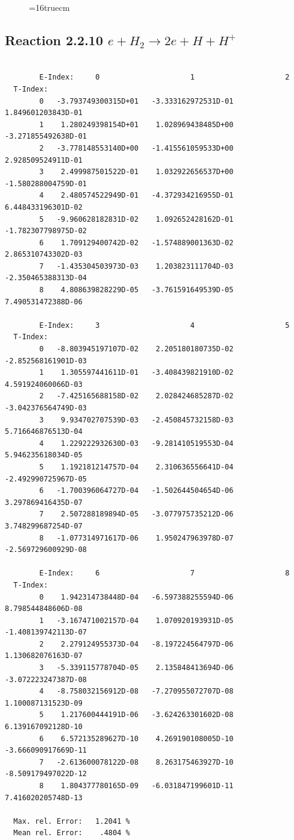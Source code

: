 \documentclass[12pt,dvips]{article}
\begin{document}
\begin{figure} \label{2.2.9}
\epsfxsize=16truecm
\end{figure}
\newpage

\subsection{
Reaction 2.2.10  $ e + H_2  \rightarrow 2e + H + H^+  $ }

\begin{small}\begin{verbatim}

        E-Index:     0                     1                     2
  T-Index:
        0   -3.793749300315D+01   -3.333162972531D-01    1.849601203843D-01
        1    1.280249398154D+01    1.028969438485D+00   -3.271855492638D-01
        2   -3.778148553140D+00   -1.415561059533D+00    2.928509524911D-01
        3    2.499987501522D-01    1.032922656537D+00   -1.580288004759D-01
        4    2.480574522949D-01   -4.372934216955D-01    6.448433196301D-02
        5   -9.960628182831D-02    1.092652428162D-01   -1.782307798975D-02
        6    1.709129400742D-02   -1.574889001363D-02    2.865310743302D-03
        7   -1.435304503973D-03    1.203823111704D-03   -2.350465388313D-04
        8    4.808639828229D-05   -3.761591649539D-05    7.490531472388D-06

        E-Index:     3                     4                     5
  T-Index:
        0   -8.803945197107D-02    2.205180180735D-02   -2.852568161901D-03
        1    1.305597441611D-01   -3.408439821910D-02    4.591924060066D-03
        2   -7.425165688158D-02    2.028424685287D-02   -3.042376564749D-03
        3    9.934702707539D-03   -2.450845732158D-03    5.716646876513D-04
        4    1.229222932630D-03   -9.281410519553D-04    5.946235618034D-05
        5    1.192181214757D-04    2.310636556641D-04   -2.492990725967D-05
        6   -1.700396064727D-04   -1.502644504654D-06    3.297869416435D-07
        7    2.507288189894D-05   -3.077975735212D-06    3.748299687254D-07
        8   -1.077314971617D-06    1.950247963978D-07   -2.569729600929D-08

        E-Index:     6                     7                     8
  T-Index:
        0    1.942314738448D-04   -6.597388255594D-06    8.798544848606D-08
        1   -3.167471002157D-04    1.070920193931D-05   -1.408139742113D-07
        2    2.279124955373D-04   -8.197224564797D-06    1.130682076163D-07
        3   -5.339115778704D-05    2.135848413694D-06   -3.072223247387D-08
        4   -8.758032156912D-08   -7.270955072707D-08    1.100087131523D-09
        5    1.217600444191D-06   -3.624263301602D-08    6.139167092128D-10
        6    6.572135289627D-10    4.269190108005D-10   -3.666090917669D-11
        7   -2.613600078122D-08    8.263175463927D-10   -8.509179497022D-12
        8    1.804377780165D-09   -6.031847199601D-11    7.416020205748D-13

  Max. rel. Error:   1.2041 %
  Mean rel. Error:    .4804 %
\end{verbatim}\end{small}
\end{document}
